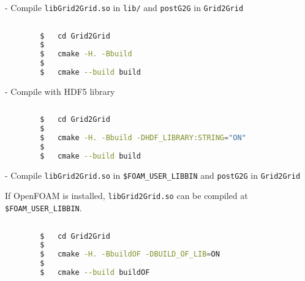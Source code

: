 		\vspace{1em}		
		- Compile \texttt{libGrid2Grid.so} in \texttt{lib/} and \texttt{postG2G} in \texttt{Grid2Grid}
		
		\begin{lstlisting}[language=bash]										
		
		$	cd Grid2Grid
		$
		$	cmake -H. -Bbuild 
		$
		$	cmake --build build
		\end{lstlisting}	
		
		\vspace{1em}		
		- Compile with HDF5 library
		
		\begin{lstlisting}[language=bash]										
		
		$	cd Grid2Grid
		$
		$	cmake -H. -Bbuild -DHDF_LIBRARY:STRING="ON"
		$
		$	cmake --build build
		\end{lstlisting}	

		\vspace{1em}				
		- Compile \texttt{libGrid2Grid.so} in \texttt{\$FOAM\_USER\_LIBBIN} and \texttt{postG2G} in \texttt{Grid2Grid}		
		
		If OpenFOAM is installed, \texttt{libGrid2Grid.so} can be compiled at \texttt{\$FOAM\_USER\_LIBBIN}.
		
		\begin{lstlisting}[language=bash]	
		
		$	cd Grid2Grid
		$
		$	cmake -H. -BbuildOF -DBUILD_OF_LIB=ON
		$
		$	cmake --build buildOF
		\end{lstlisting}	
		